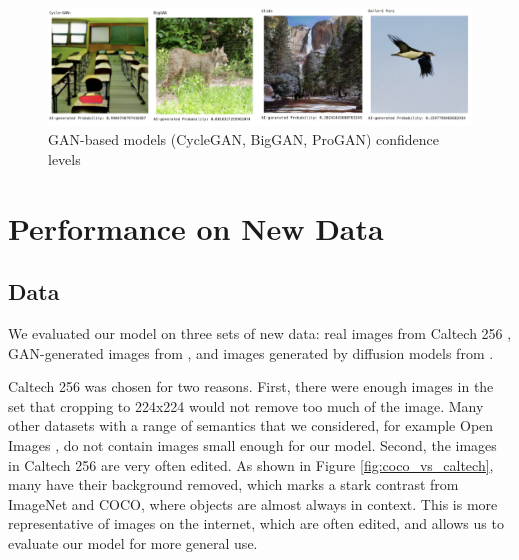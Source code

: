 \documentclass{article} %
\begin{document}
\begin{figure}[h]
    \begin{center}
        \includegraphics[scale=0.45]{figs/Confidence shrinked.png}
    \end{center}
    \caption{GAN-based models (CycleGAN, BigGAN, ProGAN) confidence levels}
    \label{fig:Conf}
\end{figure}


\section{Performance on New Data}

\subsection{Data}

We evaluated our model on three sets of new data: real images from Caltech 256 \citep{griffinholubperona2022}, GAN-generated images from \citet{chuangchuangtanGANGenDetection}, and images generated by diffusion models from \citet{stable-diffusion-100k-custom-prompts-and-images}.

Caltech 256 was chosen for two reasons. First, there were enough images in the set that cropping to 224x224 would not remove too much of the image. Many other datasets with a range of semantics that we considered, for example Open Images \citep{Kuznetsova_2020}, do not contain images small enough for our model. Second, the images in Caltech 256 are very often edited. As shown in Figure \ref{fig:coco_vs_caltech}, many have their background removed, which marks a stark contrast from ImageNet and COCO, where objects are almost always in context. This is more representative of images on the internet, which are often edited, and allows us to evaluate our model for more general use.
\end{document}
